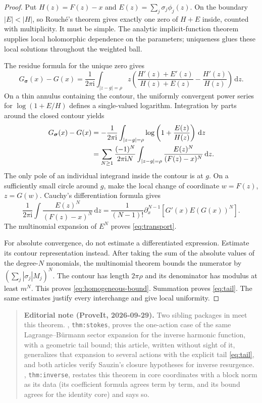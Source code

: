 \documentclass[11pt,a4paper]{article}
\numberwithin{equation}{section}
\theoremstyle{definition}
\theoremstyle{remark}
\newcommand{\ii}{\mathrm i}
\newcommand{\dd}{\,\mathrm d}
\newcommand{\bs}{\boldsymbol\sigma}
\begin{document}
\begin{proof}
Put $H(z)=F(z)-x$ and $E(z)=\sum_j\sigma_j\phi_j(z)$. On the boundary $|E|<|H|$, so Rouch\'e's theorem gives exactly one zero of $H+E$ inside, counted with multiplicity. It must be simple. The analytic implicit-function theorem supplies local holomorphic dependence on the parameters; uniqueness glues these local solutions throughout the weighted ball.

The residue formula for the unique zero gives
\[
 G_{\bs}(x)-G(x)=\frac1{2\pi\ii}\int_{|z-g|=\rho}
 z\left(\frac{H'(z)+E'(z)}{H(z)+E(z)}-\frac{H'(z)}{H(z)}\right)\dd z.
\]
On a thin annulus containing the contour, the uniformly convergent power series for $\log(1+E/H)$ defines a single-valued logarithm. Integration by parts around the closed contour yields
\begin{align}
 G_{\bs}(x)-G(x)
 &=-\frac1{2\pi\ii}\int_{|z-g|=\rho}\log\left(1+\frac{E(z)}{H(z)}\right)\dd z\notag\\
 &=\sum_{N\geq1}\frac{(-1)^N}{2\pi\ii N}
 \int_{|z-g|=\rho}\frac{E(z)^N}{(F(z)-x)^N}\dd z.
 \label{eq:contour-transport}
\end{align}
The only pole of an individual integrand inside the contour is at $g$. On a sufficiently small circle around $g$, make the local change of coordinate $w=F(z)$, $z=G(w)$. Cauchy's differentiation formula gives
\[
 \frac1{2\pi\ii}\int\frac{E(z)^N}{(F(z)-x)^N}\dd z
 =\frac1{(N-1)!}\partial_x^{N-1}\left[G'(x)E(G(x))^N\right].
\]
The multinomial expansion of $E^N$ proves \eqref{eq:transport}.

For absolute convergence, do not estimate a differentiated expression. Estimate its contour representation instead. After taking the sum of the absolute values of the degree-$N$ monomials, the multinomial theorem bounds the numerator by $(\sum_j|\sigma_j|M_j)^N$. The contour has length $2\pi\rho$ and its denominator has modulus at least $m^N$. This proves \eqref{eq:homogeneous-bound}. Summation proves \eqref{eq:tail}. The same estimates justify every interchange and give local uniformity.
\end{proof}

\begin{quote}\small\textbf{Editorial note (ProveIt, 2026-09-29).} Two sibling packages in  meet this theorem. , \texttt{thm:stokes}, proves the one-action case of the same Lagrange--B\"urmann sector expansion for the inverse harmonic function, with a geometric tail bound; this article, written without sight of it, generalizes that expansion to several actions with the explicit tail \eqref{eq:tail}, and both articles verify Sauzin's closure hypotheses for inverse resurgence. , \texttt{thm:inverse}, restates this theorem in core coordinates with a block norm as its data (its coefficient formula agrees term by term, and its bound agrees for the identity core) and says so.\end{quote}
\end{document}
